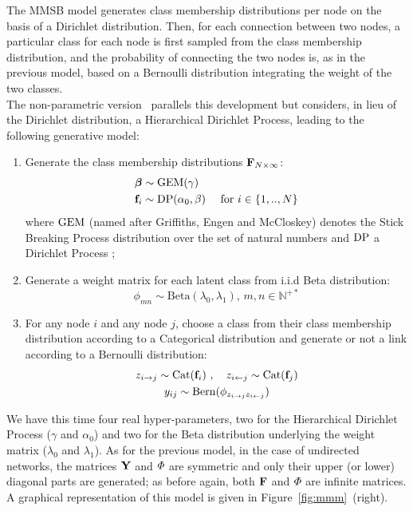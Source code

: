 The MMSB model generates class membership distributions per node on the basis of a Dirichlet distribution. Then, for each connection between two nodes, a particular class for each node is first sampled from the class membership distribution, and the probability of connecting the two nodes is, as in the previous model, based on a Bernoulli distribution integrating the weight of the two classes. 
~\\
The non-parametric version \imb\ parallels this development but considers, in lieu of the Dirichlet distribution, a Hierarchical Dirichlet Process, leading to the following generative model:
%
\begin{enumerate}
\item Generate the class membership distributions $\mathbf{F}_{N \times \infty}$:
   \begin{align}
       \bm{\beta} &\sim \mathrm{GEM}(\gamma) \nonumber \\
    \mathbf{f}_i &\sim \mathrm{DP}(\alpha_0, \beta) \quad\textnormal{ for }  i \in \{1, .., N\} \nonumber
   \end{align}
where $\mathrm{GEM}$ (named after Griffiths, Engen and McCloskey) denotes the Stick Breaking Process distribution over the set of natural numbers and $\mathrm{DP}$ a Dirichlet Process \cite{HDP};
\item Generate a weight matrix for each latent class from i.i.d Beta distribution:\\
\[ \phi_{mn} \sim \mathrm{Beta}(\lambda_0,\lambda_1), \, m,n \in \mathbb{N}^{+*} \]
\item For any node $i$ and any node $j$, choose a class from their class membership distribution according to a Categorical distribution and generate or not a link according to a Bernoulli distribution:
   \begin{gather*}
    z_{i \rightarrow j} \sim \mbox{Cat}(\mathbf{f}_i) \ , \quad z_{i \leftarrow j} \sim \mbox{Cat}(\mathbf{f}_j) \\
    y_{ij} \sim \mathrm{Bern}(\phi_{z_{i \rightarrow j}z_{i \leftarrow j}})
   \end{gather*}
\end{enumerate}
%
We have this time four real hyper-parameters, two for the Hierarchical Dirichlet Process ($\gamma$ and $\alpha_0$) and two for the Beta distribution underlying the weight matrix ($\lambda_0$ and $\lambda_1$). As for the previous model, in the case of undirected networks, the matrices $\mathbf{Y}$ and $\mat{\Phi}$ are symmetric and only their upper (or lower) diagonal parts are generated; as before again, both $\mathbf{F}$ and $\mat{\Phi}$ are infinite matrices. A graphical representation of this model is given in Figure~\ref{fig:mmm}~(right).

